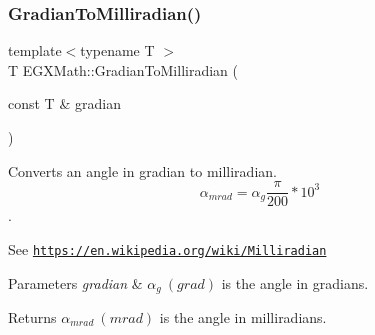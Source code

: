 \subsubsection{\texorpdfstring{Gradian\+To\+Milliradian()}{GradianToMilliradian()}}
{\footnotesize\ttfamily template$<$typename T $>$ \\
T E\+G\+X\+Math\+::\+Gradian\+To\+Milliradian (\begin{DoxyParamCaption}\item[{const T \&}]{gradian }\end{DoxyParamCaption})}



Converts an angle in gradian to milliradian. \[\alpha_{mrad}=\alpha_{g}\frac{\pi}{200}*10^3\]. 

See \href{https://en.wikipedia.org/wiki/Milliradian}{\tt https\+://en.\+wikipedia.\+org/wiki/\+Milliradian} 
\begin{DoxyParams}{Parameters}
{\em gradian} & $\alpha_{g}\ (grad)$ is the angle in gradians. \\
\hline
\end{DoxyParams}
\begin{DoxyReturn}{Returns}
$\alpha_{mrad}\ (mrad)$ is the angle in milliradians. 
\end{DoxyReturn}
